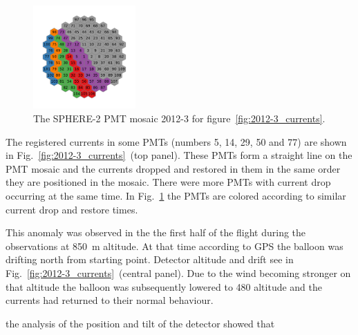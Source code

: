 \documentclass[final,5p,times,twocolumn]{elsarticle}
\begin{document}
\begin{figure}[tb]
\centering
    \includegraphics[width=0.35\textwidth]{figs/2012-3_retina_all.pdf}
    \caption{The SPHERE-2 PMT mosaic 2012-3 for figure~\ref{fig:2012-3_currents}.}
    \label{fig:2012-3_shore_image}
\end{figure}

The registered currents in some PMTs (numbers 5, 14, 29, 50 and 77) are shown in Fig.~\ref{fig:2012-3_currents}~(top panel). These PMTs form a straight line on the PMT mosaic and the currents dropped and restored in them in the same order they are positioned in the mosaic. There were more PMTs with current drop occurring at the same time. In Fig.~\ref{fig:2012-3_shore_image} the PMTs are colored according to similar current drop and restore times.

This anomaly was observed in the the first half of the flight during the observations at 850~m altitude. At that time according to GPS the balloon was drifting north from starting point. Detector altitude and drift see in Fig.~\ref{fig:2012-3_currents}~(central panel). Due to the wind becoming stronger on that altitude the balloon was subsequently lowered to 480 altitude and the currents had returned to their normal behaviour. 

the analysis of the position and tilt of the detector showed that 
\end{document}
